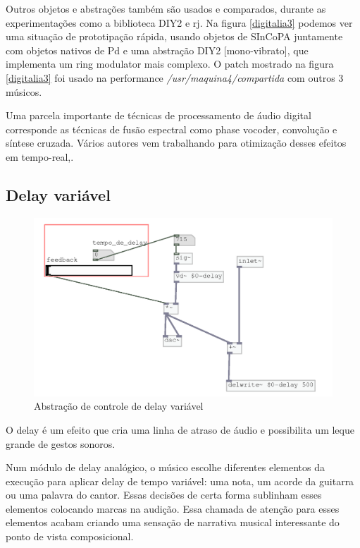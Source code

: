 \documentclass[draft]{ppgmus}
\begin{document}
Outros objetos e abstrações também são usados e comparados, durante as experimentações
como a biblioteca DIY2 e rj. Na figura \ref{digitalia3} podemos ver uma situação de prototipação
rápida, usando objetos de SInCoPA juntamente com objetos nativos de Pd e uma abstração DIY2 [mono-vibrato],
que implementa um ring modulator mais complexo. O patch mostrado na figura \ref{digitalia3} foi usado na
performance \textit{/usr/maquina4/compartida\texttildelow} com outros 3 músicos.

Uma parcela importante de técnicas de processamento de áudio digital corresponde as técnicas
de fusão espectral como phase vocoder, convolução e síntese cruzada. Vários autores vem trabalhando
para otimização desses efeitos em tempo-real\cite{porres},\cite{pd-tutorial}. 


\subsection{Delay variável}


\begin{figure}
\includegraphics[scale=.6]{sinc-delay}
\caption{Abstração de controle de delay variável}
\label{sinc-delay}
\end{figure}


O delay é um efeito que cria uma linha de atraso de áudio e possibilita
um leque grande de gestos sonoros.

Num módulo  de delay analógico, o músico escolhe diferentes elementos
da execução para aplicar delay de tempo variável: uma nota, um acorde 
da guitarra ou uma palavra do cantor. Essas decisões de certa forma 
sublinham esses elementos colocando marcas na audição. Essa chamada de
atenção para esses elementos acabam criando uma sensação de narrativa musical
interessante do ponto de vista composicional.
\end{document}
